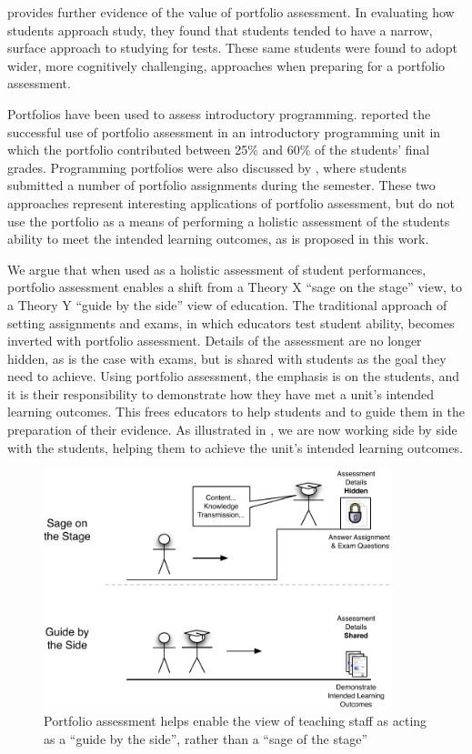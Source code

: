 \citet{Tang:1999} provides further evidence of the value of portfolio assessment. In evaluating how students approach study, they found that students tended to have a narrow, surface approach to studying for tests. These same students were found to adopt wider, more cognitively challenging, approaches when preparing for a portfolio assessment. 

Portfolios have been used to assess introductory programming. \cite{Plimmer:2000} reported the successful use of portfolio assessment in an introductory programming unit in which the portfolio contributed between 25\% and 60\% of the students' final grades. Programming portfolios were also discussed by \cite{Jones:2010}, where students submitted a number of portfolio assignments during the semester. These two approaches represent interesting applications of portfolio assessment, but do not use the portfolio as a means of performing a holistic assessment of the students ability to meet the intended learning outcomes, as is proposed in this work.


%

We argue that when used as a holistic assessment of student performances, portfolio assessment enables a shift from a Theory X ``sage on the stage'' view, to a Theory Y ``guide by the side'' view of education. The traditional approach of setting assignments and exams, in which educators test student ability, becomes inverted with portfolio assessment. Details of the assessment are no longer hidden, as is the case with exams, but is shared with students as the goal they need to achieve. Using portfolio assessment, the emphasis is on the students, and it is their responsibility to demonstrate how they have met a unit's intended learning outcomes. This frees educators to help students and to guide them in the preparation of their evidence. As illustrated in , we are now working side by side with the students, helping them to achieve the unit's intended learning outcomes. 

\begin{figure}[hb]
	\centering
	\includegraphics[width=0.90\textwidth]{SageGuide}
	\caption{Portfolio assessment helps enable the view of teaching staff as acting as a ``guide by the side'', rather than a ``sage of the stage''}
	\label{fig:sage_guide}
\end{figure}

